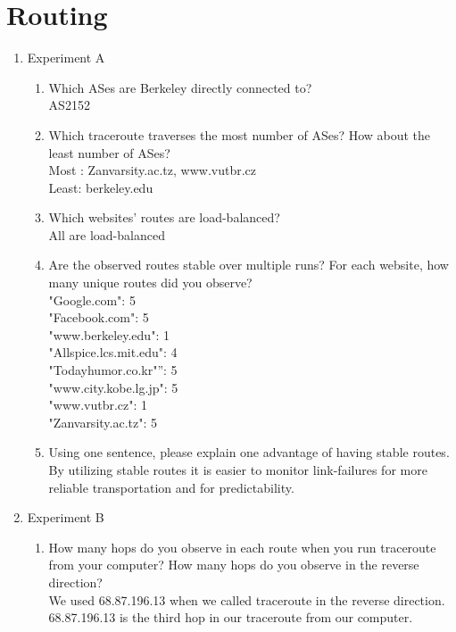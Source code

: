 \documentclass{article}
\begin{document}
\section{Routing}
\begin{enumerate}
    \item Experiment A
    \begin{enumerate}
        \item Which ASes are Berkeley directly connected to?\\
        AS2152
        \item Which traceroute traverses the most number of ASes? How about the least number of ASes?\\
        Most : Zanvarsity.ac.tz, www.vutbr.cz\\
        Least: berkeley.edu
        \item Which websites' routes are load-balanced?\\
        All are load-balanced
        \item Are the observed routes stable over multiple runs? For each website, how many unique routes did you observe?\\
        "Google.com": 5\\
        "Facebook.com": 5\\
        "www.berkeley.edu": 1\\
        "Allspice.lcs.mit.edu": 4\\
        "Todayhumor.co.kr"”: 5\\
        "www.city.kobe.lg.jp": 5\\
        "www.vutbr.cz": 1\\
        "Zanvarsity.ac.tz": 5
        \item Using one sentence, please explain one advantage of having stable routes.\\
            By utilizing stable routes it is easier to monitor link-failures for more reliable transportation and for predictability.
    \end{enumerate}
    \item Experiment B
    \begin{enumerate}
    \item How many hops do you observe in each route when you run traceroute from your computer? How many hops do you observe in the reverse direction?\\
    We used 68.87.196.13 when we called traceroute in the reverse direction. 68.87.196.13 is the third hop in our traceroute from our computer.\\

\end{enumerate}
\end{enumerate}
\end{document}
